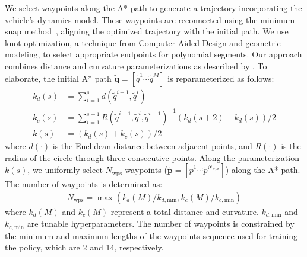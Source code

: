 
We select waypoints along the A* path to generate a trajectory incorporating the vehicle's dynamics model. 
These waypoints are reconnected using the minimum snap method~\cite{yeh2020fast, hernandez2003sampling}, aligning the optimized trajectory with the initial path. 
We use knot optimization, a technique from Computer-Aided Design and geometric modeling, to select appropriate endpoints for polynomial segments. Our approach combines distance and curvature parameterizations as described by \cite{pagani2018curvature}. 
To elaborate, the initial A* path $\tilde{\mathbf{q}} = [\tilde{q}^1 \cdots \tilde{q}^M]$ is reparameterized as follows:
\begin{align}
k_{d} (s) &= {\sum \nolimits}_{i=1}^{s} d(\tilde{q}^{i-1}, \tilde{q}^{i}) \\
k_{c} (s) &= {\sum \nolimits}_{i=1}^{s-1} R(\tilde{q}^{i-1}, \tilde{q}^{i}, \tilde{q}^{i+1})^{-1} (k_{d}(s+2) - k_{d}(s)) / 2 \\
k(s) &= (k_d(s) + k_c(s)) / 2
\end{align}
where $d(\cdot)$ is the Euclidean distance between adjacent points, and $R(\cdot)$ is the radius of the circle through three consecutive points.
Along the parameterization $k(s)$, we uniformly select $N_\text{wps}$ waypoints ($\tilde{\mathbf{p}} = [\tilde p^1 \cdots \tilde p^{N_\text{wps}}]$) along the A* path. 
The number of waypoints is determined as:
\begin{align}
N_{\text{wps}} = \max (k_{d}(M) / k_{d, \text{min}}, k_{c}(M) / k_{c, \text{min}})
\end{align}
where $k_{d}(M)$ and $k_{c}(M)$ represent a total distance and curvature.
$k_{d, \text{min}}$ and $k_{c, \text{min}}$ are tunable hyperparameters. 
The number of waypoints is constrained by the minimum and maximum lengths of the waypoints sequence used for training the policy, which are 2 and 14, respectively.


